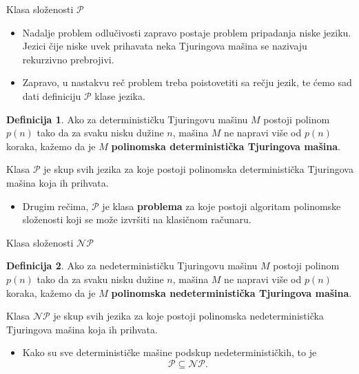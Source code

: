 \documentclass[aspectratio=169, xcolor=table, 10pt]{beamer}
\theoremstyle{definition}
\newtheorem{defi}{Definicija}[section]
\begin{document}
\begin{frame}{Klasa slo\v zenosti $\mathcal{P}$}

\begin{itemize}
    
\item Nadalje problem odlu\v civosti zapravo postaje problem pripadanja niske jeziku. Jezici \v cije niske uvek prihavata neka Tjuringova ma\v sina se nazivaju rekurzivno prebrojivi.
\item Zapravo, u nastakvu re\v c problem treba poistovetiti sa re\v cju jezik, te \' cemo sad dati definiciju $\mathcal{P}$ klase jezika.

\end{itemize}

\begin{defi}
    Ako za deterministi\v cku Tjuringovu ma\v sinu $M$ postoji polinom $p(n)$ tako da za svaku nisku du\v zine $n$, ma\v sina $M$ ne napravi vi\v se od $p(n)$ koraka, ka\v zemo da je $M$ \textbf{polinomska deterministi\v cka Tjuringova ma\v sina}.

    Klasa $\mathcal{P}$ je skup svih jezika za koje postoji polinomska deterministi\v cka Tjuringova ma\v sina koja ih prihvata.
\end{defi}

\begin{itemize}
    \item Drugim re\v cima, $\mathcal{P}$ je klasa \textbf{problema} za koje postoji algoritam polinomske slo\v zenosti koji se mo\v ze izvr\v siti na klasi\v cnom ra\v cunaru.
\end{itemize}
    
\end{frame}

\begin{frame}{Klasa slo\v zenosti $\mathcal{NP}$}

\begin{defi}
    Ako za nedeterministi\v cku Tjuringovu ma\v sinu $M$ postoji polinom $p(n)$ tako da za svaku nisku du\v zine $n$, ma\v sina $M$ ne napravi vi\v se od $p(n)$ koraka, ka\v zemo da je $M$ \textbf{polinomska nedeterministi\v cka Tjuringova ma\v sina}.

    Klasa $\mathcal{NP}$ je skup svih jezika za koje postoji polinomska nedeterministi\v cka Tjuringova ma\v sina koja ih prihvata.
\end{defi}

\begin{itemize}
    \item Kako su sve deterministi\v cke ma\v sine podskup nedeterministi\v ckih, to je $$\mathcal{P} \subseteq \mathcal{NP}.$$
\end{itemize}
\end{frame}
\end{document}
